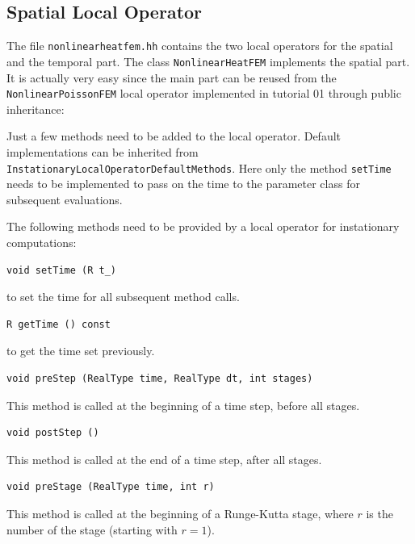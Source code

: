 \documentclass[a4paper,12pt]{article}
\begin{document}
\subsection{Spatial Local Operator}

The file \lstinline{nonlinearheatfem.hh} contains the two local operators
for the spatial and the temporal part. The class \lstinline{NonlinearHeatFEM} implements the
spatial part. It is actually very easy since the main part can be reused
from the \lstinline{NonlinearPoissonFEM} local operator  implemented in tutorial 01 through
public inheritance:

Just a few methods need to be added to the local operator.
Default implementations can be inherited from
\lstinline{InstationaryLocalOperatorDefaultMethods}. Here only the method
\lstinline{setTime} needs to be implemented to pass on the time
to the parameter class for subsequent evaluations.

The following methods need to be provided by a local
operator for instationary computations:
\begin{lstlisting}[basicstyle=\ttfamily,
frame=single,
backgroundcolor=\color{listingbg}]
void setTime (R t_)
\end{lstlisting}
to set the time for all subsequent method calls.

\begin{lstlisting}[basicstyle=\ttfamily,
frame=single,
backgroundcolor=\color{listingbg}]
R getTime () const
\end{lstlisting}
to get the time set previously.

\begin{lstlisting}[basicstyle=\ttfamily,
frame=single,
backgroundcolor=\color{listingbg}]
void preStep (RealType time, RealType dt, int stages)
\end{lstlisting}
This method is called at the beginning of a time step, before all stages.

\begin{lstlisting}[basicstyle=\ttfamily,
frame=single,
backgroundcolor=\color{listingbg}]
void postStep ()
\end{lstlisting}
This method is called at the end of a time step, after all stages.

\begin{lstlisting}[basicstyle=\ttfamily,
frame=single,
backgroundcolor=\color{listingbg}]
void preStage (RealType time, int r)
\end{lstlisting}
This method is called at the beginning of a Runge-Kutta stage, where
$r$ is the number of the stage (starting with $r=1$).
\end{document}
